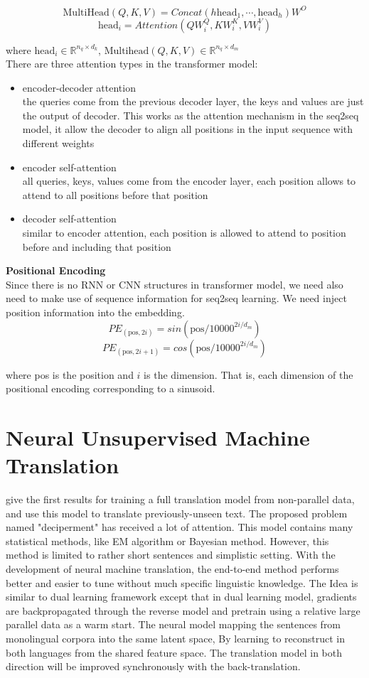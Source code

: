 \[ \text{MultiHead}(Q, K, V) = Concat(h\text{head}_1, \cdots, \text{head}_h)W^O \]
\[\text{head}_i = Attention(QW_i^Q, KW_i^K, VW_i^V) \]

where  $\text{head}_i \in \mathbb{R}^{n_q \times d_k}$,  ${\text{Multihead}(Q,K,V) \in \mathbb{R}^{n_q \times d_m}}$\\


There are three attention types in the transformer model:
\begin{itemize}
	\item encoder-decoder attention\\
	the queries come from the previous decoder layer, the keys and values are just the output of decoder. This works as the attention mechanism in the seq2seq model, it allow the decoder to align all positions in the input sequence with different weights
	\item encoder self-attention\\
	all queries, keys, values come from the encoder layer, each position allows to attend to all positions before that position
	\item decoder self-attention\\
	similar to encoder attention, each position is allowed to attend to position before and including that position
\end{itemize}


\textbf{Positional Encoding}\\
Since there is no RNN or CNN structures in transformer model, we need also need to make use of sequence information for seq2seq learning. We need inject position information into the embedding.
\[PE_{(\text{pos}, 2i)} = sin(\text{pos}/ 10000 ^{2i / d_{m}})\]
\[ PE_{(\text{pos}, 2i+1)} = cos(\text{pos} / 10000^{2i/d_{m}})\]


where pos is the position and $i$ is the dimension. That is, each dimension of the positional encoding corresponding to a sinusoid.






\section{Neural Unsupervised Machine Translation}
give the first results for training a full translation model from non-parallel data, and use this model to translate previously-unseen text. The proposed problem named "deciperment" has received a lot of attention. This model contains many statistical methods, like EM algorithm or Bayesian method. However, this method is limited to rather short sentences and simplistic setting. With the development of neural machine translation, the end-to-end method performs better and easier to tune without much specific linguistic knowledge. The Idea is similar to dual learning framework except that in dual learning model, gradients are backpropagated through the reverse model and pretrain using a relative large parallel data as a warm start. The neural model mapping the sentences from monolingual corpora into the same latent space, By learning to reconstruct in both languages from the shared feature space. The translation model in both direction will be improved synchronously with the back-translation.


